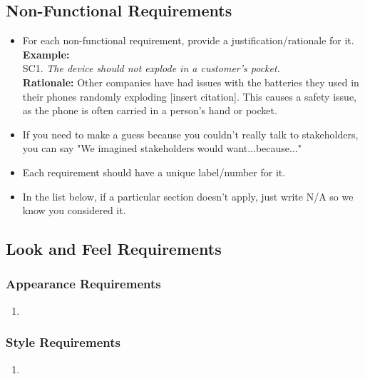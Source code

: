 \documentclass[]{article}
\begin{document}
\begin{enumerate}[{\bf BE1.}]

\section{Non-Functional Requirements}
\label{sec:non-functional_requirements}


\begin{itemize}
	\item For each non-functional requirement, provide a justification/rationale for it.\\
	{\bf Example:} \\
	SC1. \emph{The device should not explode in a customer’s pocket.}\\
	{\bf Rationale:} Other companies have had issues with the batteries they used in their phones randomly exploding [insert citation]. This causes a safety issue, as the phone is often carried in a person's hand or pocket.	
	\item If you need to make a guess because you couldn't really talk to stakeholders, you can say "We imagined stakeholders would want...because..."
	\item Each requirement should have a unique label/number for it.
	\item In the list below, if a particular section doesn't apply, just write N/A so we know you considered it.
\end{itemize}

\subsection{Look and Feel Requirements}
\label{sub:look_and_feel_requirements}

\subsubsection{Appearance Requirements}
\label{ssub:appearance_requirements}
\begin{enumerate}[{LF-A}1. ]
	\item 
\end{enumerate}

\subsubsection{Style Requirements}
\label{ssub:style_requirements}
\begin{enumerate}[{LF-S}1. ]
	\item 
\end{enumerate}


\end{enumerate}
\end{document}
